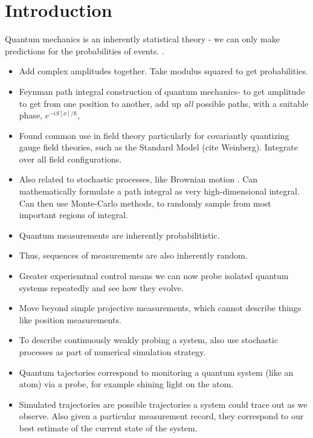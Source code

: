 \chapter{Introduction}



Quantum mechanics is an inherently statistical theory - we can only make predictions for the probabilities of events.  
.
\begin{itemize}
\item Add complex amplitudes together.  Take modulus squared to get probabilities.  
\item Feynman path integral construction of quantum mechanics- 
to get amplitude to get from one position to another, add up \emph{all} possible paths,
 with a suitable phase, $e^{-i S[x]/\hbar}$, \cite{Feynman1942, Feynman1965}
\item Found common use in field theory particularly for covariantly quantizing gauge field theories,
 such as the Standard Model (cite Weinberg).  Integrate over all field configurations.  
\item  Also related to stochastic processes, like Brownian motion \cite{Karatzas1991}.
   Can mathematically formulate a path integral as very high-dimensional integral.
  Can then use Monte-Carlo methods, to randomly sample from most important regions of integral.  
\end{itemize}

\begin{itemize}
\item Quantum measurements are inherently probabilitistic.  
\item Thus, sequences of measurements are also inherently random.  
\item Greater experiemtnal control means we can now probe isolated quantum systems repeatedly and see how they evolve.  
\item Move beyond simple projective measurements, which cannot describe things like position measurements.
\item To describe continuously weakly probing a system, also use stochastic processes as part of
 numerical simulation strategy.
\item Quantum tajectories correspond to monitoring a quantum system (like an atom) via a probe,
 for example shining light on the atom. \cite{Carmichael1993}
\item Simulated trajectories are possible trajectories a system could trace out as we observe.
  Also given a particular measurement record, they correspond to our best estimate of the current state of the system.  
\end{itemize}

